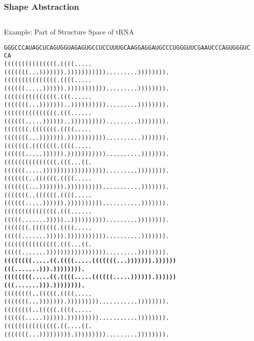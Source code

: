 \documentclass[ignorenonframetext,10pt]{beamer}
\begin{document}
\frame
{
  \frametitle{\large Shape Abstraction}
  \small
  \begin{columns}
    \begin{column}{.75\textwidth}
      \begin{block}{Example: Part of Structure Space of tRNA}
        \begin{alltt}\tiny
          GGGCCCAUAGCUCAGUGGUAGAGUGCCUCCUUUGCAAGGAGGAUGCCCUGGGUUCGAAUCCCAGUGGGUCCA\\
          (((((((((((((((.((((.....(((((((...))))))).))))))))))).........)))))))).\\
          (((((((((((((((.((((.....((((((.....)))))).))))))))))).........)))))))).\\
          (((((((((((((((.(((......(((((((...)))))))..)))))))))).........)))))))).\\
          (((((((((((((((.(((......((((((.....))))))..)))))))))).........)))))))).\\
          (((((((.(((((((.((((.....(((((((...))))))).)))))))))))..........))))))).\\
          (((((((.(((((((.((((.....((((((.....)))))).)))))))))))..........))))))).\\
          (((((((((((((((.(((...((.((((((.....)))))))))))))))))).........)))))))).\\
          (((((((..((((((.((((.....(((((((...))))))).))))))))))...........))))))).\\
          (((((((..((((((.((((.....((((((.....)))))).))))))))))...........))))))).\\
          (((((((((((((((.(((......(((((.......)))))..)))))))))).........)))))))).\\
          (((((((.(((((((.((((.....(((((.......))))).)))))))))))..........))))))).\\
          (((((((((((((((.(((...((.(((((.......))))))))))))))))).........)))))))).\\
          \alert<2->{\textbf<2->{((((((((.....((.((((.....(((((((...))))))).))))))(((.......))).)))))))).}}\\
          \alert<2->{\textbf<2->{((((((((.....((.((((.....((((((.....)))))).))))))(((.......))).)))))))).}}\\
          ((((((((..(((((.((((.....(((((((...))))))).)))))))))...........)))))))).\\
          ((((((((..(((((.((((.....((((((.....)))))).)))))))))...........)))))))).\\
          (((((((((((((((.((....((.(((((((...))))))))).))))))))).........)))))))).\\

\end{alltt}
\end{block}
\end{column}
\end{columns}}
\end{document}
